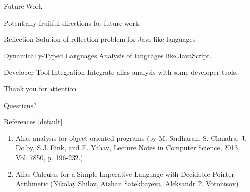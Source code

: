 \documentclass{beamer}
\begin{document}
\begin{frame}{Future Work}
	\begin{block}{}
		Potentially fruitful directions for future work:
	\end{block}	
	\pause	
	\begin{block}{Reflection}
		Solution of reflection problem for Java-like languages
	\end{block}	
	\pause	
	\begin{block}{Dynamically-Typed Languages}
		Analysis of languages like JavaScript.
	\end{block}	
	\pause	
	\begin{block}{Developer Tool Integration}
		Integrate alias analysis with some developer tools.
	\end{block}	
\end{frame}

\begin{frame}{}
	\begin{spacing}{1.5}
		\LARGE{\centerline{Thank you for attention}}
	\end{spacing}
	\large{\centerline{Questions?}}
\end{frame}

\begin{frame}{References}
	[default]
	\begin{enumerate}
   		\item Alias analysis for object-oriented programs (by M. Sridharan, S. Chandra, J. Dolby, S.J. Fink,
   		 and E. Yahav, Lecture Notes in Computer Science, 2013, Vol. 7850, p. 196-232.)
   		\item Alias Calculus for a Simple Imperative Language with Decidable Pointer Arithmetic (Nikolay
   		 Shilov, Aizhan Satekbayeva, Aleksandr P. Vorontsov)
	\end{enumerate}
\end{frame}
\end{document}
